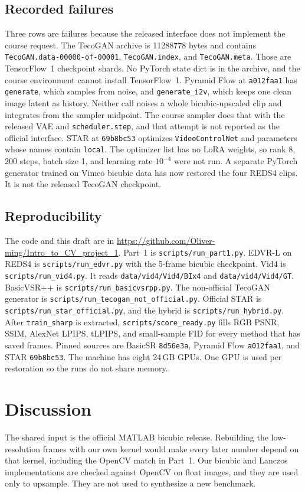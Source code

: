 \documentclass[10pt,twocolumn,letterpaper]{article}
\begin{document}
\subsection{Recorded failures}
Three rows are failures because the released interface does not implement the course request.
The TecoGAN archive is 11288778 bytes and contains \texttt{TecoGAN.data-00000-of-00001}, \texttt{TecoGAN.index}, and \texttt{TecoGAN.meta}.
Those are TensorFlow~1 checkpoint shards. No PyTorch state dict is in the archive, and the course environment cannot install TensorFlow~1.
Pyramid Flow at \texttt{a012faa1} has \texttt{generate}, which samples from noise, and \texttt{generate\_i2v}, which keeps one clean image latent as history.
Neither call noises a whole bicubic-upscaled clip and integrates from the sampler midpoint.
The course sampler does that with the released VAE and \texttt{scheduler.step}, and that attempt is not reported as the official interface.
STAR at \texttt{69b8bc53} optimizes \texttt{VideoControlNet} and parameters whose names contain \texttt{local}.
The optimizer list has no LoRA weights, so rank 8, 200 steps, batch size 1, and learning rate $10^{-4}$ were not run.
A separate PyTorch generator trained on Vimeo bicubic data has now restored the four REDS4 clips.
It is not the released TecoGAN checkpoint.

\subsection{Reproducibility}
The code and this draft are in \url{https://github.com/Oliver-ming/Intro_to_CV_project_1}.
Part~1 is \texttt{scripts/run\_part1.py}.
EDVR-L on REDS4 is \texttt{scripts/run\_edvr.py} with the 5-frame bicubic checkpoint.
Vid4 is \texttt{scripts/run\_vid4.py}.
It reads \texttt{data/vid4/Vid4/BIx4} and \texttt{data/vid4/Vid4/GT}.
BasicVSR++ is \texttt{scripts/run\_basicvsrpp.py}.
The non-official TecoGAN generator is \texttt{scripts/run\_tecogan\_not\_official.py}.
Official STAR is \texttt{scripts/run\_star\_official.py}, and the hybrid is \texttt{scripts/run\_hybrid.py}.
After \texttt{train\_sharp} is extracted, \texttt{scripts/score\_ready.py} fills RGB PSNR, SSIM, AlexNet LPIPS, tLPIPS, and small-sample FID for every method that has saved frames.
Pinned sources are BasicSR \texttt{8d56e3a}, Pyramid Flow \texttt{a012faa1}, and STAR \texttt{69b8bc53}.
The machine has eight 24\,GB GPUs.
One GPU is used per restoration so the runs do not share memory.

\section{Discussion}
The shared input is the official MATLAB bicubic release.
Rebuilding the low-resolution frames with our own kernel would make every later number depend on that kernel, including the OpenCV match in Part~1.
Our bicubic and Lanczos implementations are checked against OpenCV on float images, and they are used only to upsample.
They are not used to synthesize a new benchmark.
\end{document}
